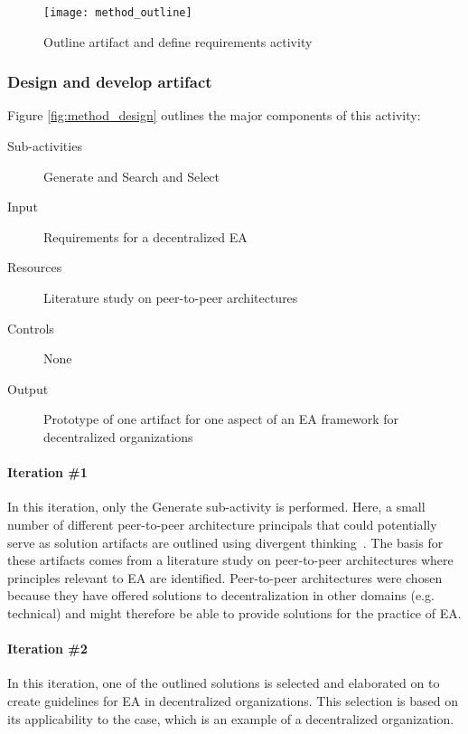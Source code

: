 \begin{figure}
\texttt{[image: method\_outline]}
\caption{Outline artifact and define requirements activity}
\label{fig:method_outline}
\end{figure}

\subsubsection*{Design and develop artifact}

Figure \ref{fig:method_design} outlines the major components of this activity:
\begin{description}
  \item[Sub-activities] Generate and Search and Select~\cite[Ch. 7]{johannessonPerjons2012}
  \item[Input]  Requirements for a decentralized EA 
  \item[Resources] Literature study on peer-to-peer architectures
  \item[Controls] None
  \item[Output] Prototype of one artifact for one aspect of an EA framework for decentralized organizations 
\end{description}

\paragraph{Iteration \#1}

In this iteration, only the Generate sub-activity is performed. Here, a small number of different peer-to-peer architecture principals that could potentially serve as solution artifacts are outlined using divergent thinking~\cite[Ch. 7.1]{johannessonPerjons2012}. The basis for these artifacts comes from a literature study on peer-to-peer architectures where principles relevant to EA are identified. Peer-to-peer architectures were chosen because they have offered solutions to decentralization in other domains (e.g. technical) and might therefore be able to provide solutions for the practice of EA.

\paragraph{Iteration \#2}

In this iteration, one of the outlined solutions is selected and elaborated on to create guidelines for EA in decentralized organizations. This selection is based on its applicability to the case, which is an example of a decentralized organization. 

